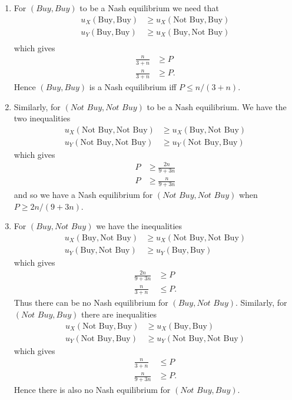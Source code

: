 \documentclass[a4paper]{article}
\begin{document}
\begin{exercise}{5}
\begin{enumerate}[label=(\alph*)]
    \item For $ (Buy, Buy) $ to be a Nash equilibrium we need that
      \begin{align*}
        u_X(\text{Buy}, \text{Buy}) &\geq u_X(\text{Not Buy}, \text{Buy}) \\
        u_Y(\text{Buy}, \text{Buy}) &\geq u_X(\text{Buy}, \text{Not Buy}) \\
      \end{align*}
      which gives
      \begin{align*}
        \frac{n}{3 + n} &\geq P \\
        \frac{n}{3 + n} &\geq P.
      \end{align*}
      Hence $ (Buy, Buy) $ is a Nash equilibrium iff $ P \leq n/(3 + n) $.

    \item Similarly, for $ (Not\,\, Buy, Not\,\, Buy) $ to be a Nash equilibrium. We have the two inequalities
      \begin{align*}
        u_X(\text{Not Buy}, \text{Not Buy}) &\geq u_X(\text{Buy}, \text{Not Buy}) \\
        u_Y(\text{Not Buy}, \text{Not Buy}) &\geq u_Y(\text{Not Buy}, \text{Buy})
      \end{align*}
      which gives
      \begin{align*}
        P &\geq \frac{2n}{9 + 3n} \\
        P &\geq \frac{n}{9 + 3n}
      \end{align*}
      and so we have a Nash equilibrium for $ (Not\,\,Buy, Not\,\,Buy) $ when $ P \geq 2n/(9+3n) $.

    \item For $ (Buy, Not\,\, Buy) $ we have the inequalities
      \begin{align*}
        u_X(\text{Buy}, \text{Not Buy}) &\geq u_X(\text{Not Buy}, \text{Not Buy}) \\
        u_Y(\text{Buy}, \text{Not Buy}) &\geq u_Y(\text{Buy}, \text{Buy})
      \end{align*}
      which gives
      \begin{align*}
        \frac{2n}{9 + 3n} &\geq P \\
        \frac{n}{3 + n} &\leq P
      .\end{align*}
      Thus there can be no Nash equilibrium for $ (Buy, Not\,\,Buy) $. Similarly, for $ (Not\,\,Buy, Buy) $ there are inequalities
      \begin{align*}
        u_X(\text{Not Buy}, \text{Buy}) &\geq u_X(\text{Buy}, \text{Buy}) \\
        u_Y(\text{Not Buy}, \text{Buy}) &\geq u_Y(\text{Not Buy}, \text{Not Buy})
      \end{align*}
      which gives
      \begin{align*}
        \frac{n}{3+n} &\leq P \\
        \frac{n}{9 + 3n} &\geq P.
      \end{align*}
      Hence there is also no Nash equilibrium for $ (Not\,\,Buy, Buy) $.
  \end{enumerate}
\end{exercise}
\end{document}
